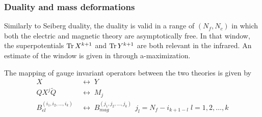 \subsubsection{Duality and mass deformations}
Similarly to Seiberg duality, the duality is valid in a range of $(N_f,N_c)$ in which both the electric and magnetic theory are asymptotically free. 
In that window, the superpotentials $\mathrm{Tr } \, X^{k+1}$ and $\mathrm{Tr } \, Y^{k+1}$ are both relevant in the infrared.
An estimate of the window is given in \cite{Kutasov:2003iy} through a-maximization.  



The mapping of gauge invariant operators between the two theories is given by
\begin{equation}
\begin{aligned}
X \; & \longleftrightarrow \; Y \\
Q X^j \tilde{Q} \; & \longleftrightarrow  \; M_j \\
B^{(i_1, i_2, \dotsc, i_k)}_{el} \; & \longleftrightarrow \; B_{mag}^{(j_1, j_2 ,\dotsc, j_k) } \;  \, j_l = N_f - i_{k+1-l} \; l = 1,2,\dotsc,k
\end{aligned}
\end{equation}

